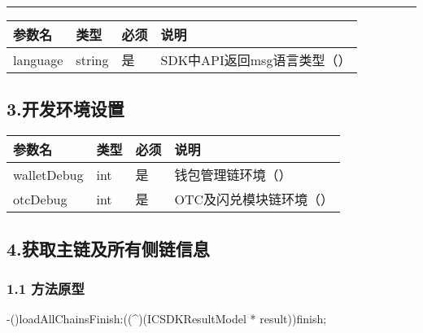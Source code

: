 \documentclass[letterpaper,10pt,english]{sphinxmanual}
\begin{document}
\bigskip\hrule\bigskip




\begin{savenotes}\sphinxattablestart
\centering
\begin{tabulary}{\linewidth}[t]{|T|T|T|T|}
\hline
\sphinxstyletheadfamily 
参数名
&\sphinxstyletheadfamily 
类型
&\sphinxstyletheadfamily 
必须
&\sphinxstyletheadfamily 
说明
\\
\hline
language
&
string
&
是
&
SDK中API返回msg语言类型（）
\\
\hline
\end{tabulary}
\par
\sphinxattableend\end{savenotes}


\subsection{3.开发环境设置}
\label{\detokenize{BCBWalletSDK_u63a5_u53e3_u8bf4_u660e:id8}}


\begin{savenotes}\sphinxattablestart
\centering
\begin{tabulary}{\linewidth}[t]{|T|T|T|T|}
\hline
\sphinxstyletheadfamily 
参数名
&\sphinxstyletheadfamily 
类型
&\sphinxstyletheadfamily 
必须
&\sphinxstyletheadfamily 
说明
\\
\hline
walletDebug
&
int
&
是
&
钱包管理链环境（）
\\
\hline
otcDebug
&
int
&
是
&
OTC及闪兑模块链环境（）
\\
\hline
\end{tabulary}
\par
\sphinxattableend\end{savenotes}


\subsection{4.获取主链及所有侧链信息}
\label{\detokenize{BCBWalletSDK_u63a5_u53e3_u8bf4_u660e:id9}}

\subsubsection{1.1 方法原型}
\label{\detokenize{BCBWalletSDK_u63a5_u53e3_u8bf4_u660e:id10}}
-()loadAllChainsFinish:((\textasciicircum{})(ICSDKResultModel *
result))finish;
\end{document}
